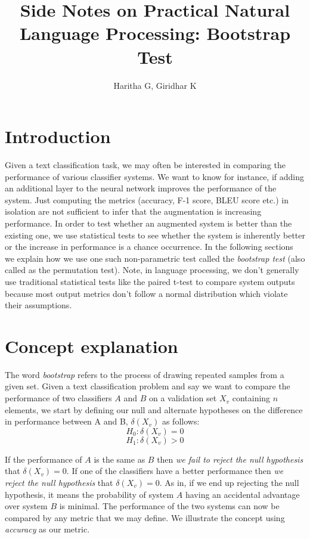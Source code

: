 \documentclass[a4paper,14pt]{extarticle}
\title{Side Notes on Practical Natural Language Processing: Bootstrap Test}
\author{Haritha G, Giridhar K}
\begin{document}
\maketitle

\section{Introduction}
Given a text classification task, we may often be interested in comparing the performance of various classifier systems. We want to know for instance, if adding an additional layer to the neural network improves the performance of the system. Just computing the metrics (accuracy, F-1 score, BLEU score etc.) in isolation are not sufficient to infer that the augmentation is increasing performance. In order to test whether an augmented system is better than the existing one, we use statistical tests to see whether the system is inherently better or the increase in performance is a chance occurrence. In the following sections we explain how we use one such non-parametric test called the \textit{bootstrap test} (also called as the permutation test). Note, in language processing, we don't generally use traditional statistical tests like the paired t-test to compare system outputs because most output metrics don't follow a normal distribution which violate their assumptions. 

\section{Concept explanation}
The word \textit{bootstrap} refers to the process of drawing repeated samples from a given set. Given a text classification problem and say we want to compare the performance of two classifiers $A$ and $B$ on a validation set $X_v$ containing $n$ elements, we start by defining our null and alternate hypotheses on the difference in performance between A and B, $\delta(X_v)$ as follows:
$$H_0: \delta(X_v) = 0 $$
$$H_1: \delta(X_v) > 0$$

If the performance of $A$ is the same as $B$ then \textit{we fail to reject the null hypothesis} that $\delta(X_v) = 0$. If one of the classifiers have a better performance then \textit{we reject the null hypothesis} that  $\delta(X_v) = 0$. As in, if we end up rejecting the null hypothesis, it means the probability of system $A$ having an accidental advantage over system $B$ is minimal. The performance of the two systems can now be compared by any metric that we may define. We illustrate the concept using \textit{accuracy} as our metric.
\end{document}
